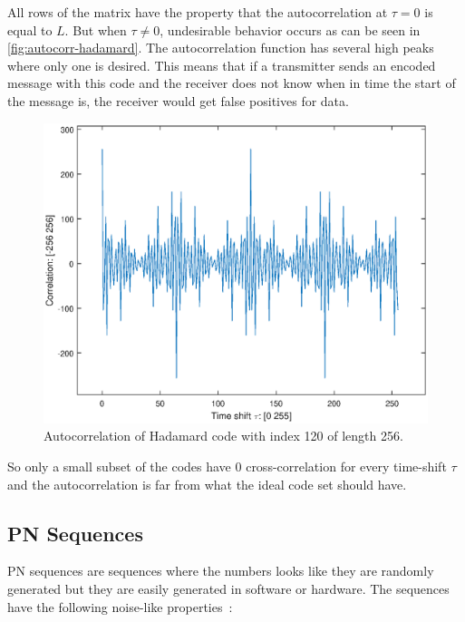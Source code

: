 		All rows of the matrix have the property that the autocorrelation at $\tau = 0$ is equal to $L$.
		But when $\tau \neq 0$, undesirable behavior occurs as can be seen in \autoref{fig:autocorr-hadamard}.
		The autocorrelation function has several high peaks where only one is desired.
		This means that if a transmitter sends an encoded message with this code and the receiver does not know when in time the start of the message is, the receiver would get false positives for data.

		\begin{figure}
			\centering
			\includegraphics[width=\textwidth]{chapters/CDMA/autocorr-hadamard.eps}
			\caption{Autocorrelation of Hadamard code with index 120 of length 256.}
			\label{fig:autocorr-hadamard}
		\end{figure}

		So only a small subset of the codes have $0$ cross-correlation for every time-shift $\tau$ and the autocorrelation is far from what the ideal code set should have.


	\subsection{PN Sequences}
	\label{sec:theory-pn}
		PN sequences are sequences where the numbers looks like they are randomly generated but they are easily generated in software or hardware.
		The sequences have the following noise-like properties~\cite{mitra2008pseudo}:

